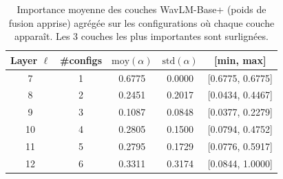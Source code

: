 
\begin{table}[ht]
\centering
\small
\begin{tabular}{c c c c c}
\toprule
\textbf{Layer $\ell$} &
\textbf{\#configs} &
\textbf{$\text{moy}(\alpha)$} &
\textbf{$\text{std}(\alpha)$} &
\textbf{[min, max]} \\
\midrule
\rowcolor{green!20}
 7 & 1 & 0.6775 & 0.0000 & [0.6775, 0.6775] \\
 8 & 2 & 0.2451 & 0.2017 & [0.0434, 0.4467] \\
 9 & 3 & 0.1087 & 0.0848 & [0.0377, 0.2279] \\
\rowcolor{green!20}
10 & 4 & 0.2805 & 0.1500 & [0.0794, 0.4752] \\
11 & 5 & 0.2795 & 0.1729 & [0.0776, 0.5917] \\
\rowcolor{green!20}
12 & 6 & 0.3311 & 0.3174 & [0.0844, 1.0000] \\
\bottomrule
\end{tabular}
\caption{Importance moyenne des couches WavLM-Base+ (poids de fusion apprise) agrégée sur les configurations où chaque couche apparaît. Les 3 couches les plus importantes sont surlignées.}
\label{tab:layer_importance_stats}
\end{table}
